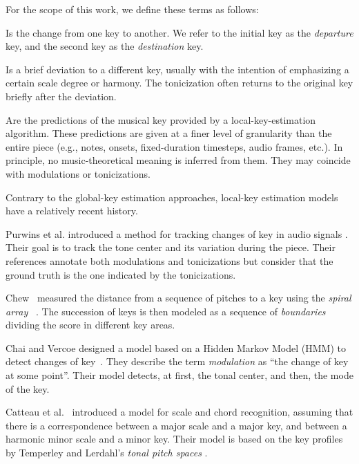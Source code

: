 For the scope of this work, we define these terms as follows:

Is the change from one key to another. We refer to the initial key as the \emph{departure} key, and the second key as the \emph{destination} key.

Is a brief deviation to a different key, usually with the intention of emphasizing a certain scale degree or harmony.
The tonicization often returns to the original key briefly after the deviation.

Are the predictions of the musical key provided by a local-key-estimation algorithm.
These predictions are given at a finer level of granularity than the entire piece (e.g., notes, onsets, fixed-duration timesteps, audio frames, etc.).
In principle, no music-theoretical meaning is inferred from them. They may coincide with modulations or tonicizations.

\label{ssec:localkey}

Contrary to the global-key estimation approaches, local-key estimation models have a relatively recent history.

Purwins et al. introduced a method for tracking changes of key in audio signals %
\cite{purwins2000new}.
Their goal is to track the tone center and its variation during the piece. Their references annotate both modulations and tonicizations but consider that the ground truth is the one indicated by the tonicizations.

Chew~\cite{chew2002key} measured the distance from a sequence of pitches to a key using the \emph{spiral array} ~\cite{chew2000towardsam}.
The succession of keys is then modeled as a sequence of \emph{boundaries} dividing the score in different key areas.

Chai and Vercoe designed a model based on a Hidden Markov Model (HMM) to detect changes of key~\cite{chai2005detection}.
They describe the term \emph{modulation} as ``the change of key at some point''.
Their model detects, at first, the tonal center, and then, the mode of the key.

Catteau et al.~\cite{catteau07tonalkey} introduced a model for scale and chord recognition, assuming that there is a correspondence between a major scale and a major key, and between a harmonic minor scale and a minor key. Their model is based on the key profiles by Temperley \cite{temperley99tonality} and Lerdahl's \emph{tonal pitch spaces} \cite{lerdahl88tps}.

